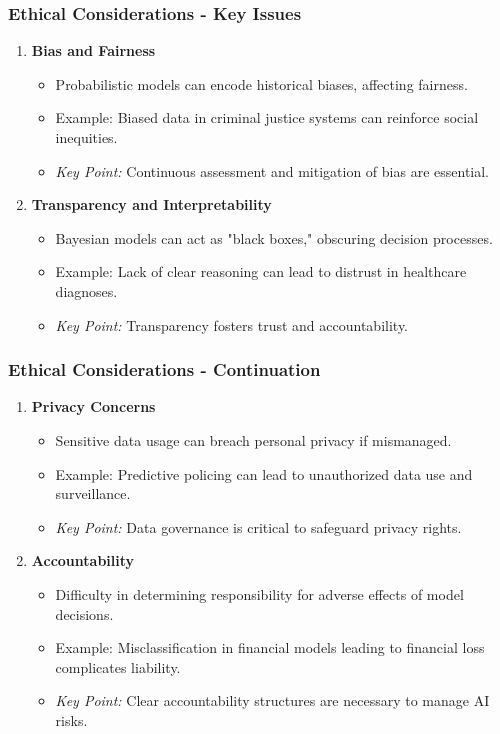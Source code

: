 \documentclass[aspectratio=169]{beamer}
\begin{document}
\begin{frame}[fragile]
    \frametitle{Ethical Considerations - Key Issues}
    \begin{enumerate}
        \item \textbf{Bias and Fairness}
            \begin{itemize}
                \item Probabilistic models can encode historical biases, affecting fairness.
                \item Example: Biased data in criminal justice systems can reinforce social inequities.
                \item \textit{Key Point:} Continuous assessment and mitigation of bias are essential.
            \end{itemize}
        
        \item \textbf{Transparency and Interpretability}
            \begin{itemize}
                \item Bayesian models can act as "black boxes," obscuring decision processes.
                \item Example: Lack of clear reasoning can lead to distrust in healthcare diagnoses.
                \item \textit{Key Point:} Transparency fosters trust and accountability.
            \end{itemize}
    \end{enumerate}
\end{frame}

\begin{frame}[fragile]
    \frametitle{Ethical Considerations - Continuation}
    \begin{enumerate}[resume]
        \item \textbf{Privacy Concerns}
            \begin{itemize}
                \item Sensitive data usage can breach personal privacy if mismanaged.
                \item Example: Predictive policing can lead to unauthorized data use and surveillance.
                \item \textit{Key Point:} Data governance is critical to safeguard privacy rights.
            \end{itemize}

        \item \textbf{Accountability}
            \begin{itemize}
                \item Difficulty in determining responsibility for adverse effects of model decisions.
                \item Example: Misclassification in financial models leading to financial loss complicates liability.
                \item \textit{Key Point:} Clear accountability structures are necessary to manage AI risks.
            \end{itemize}
    \end{enumerate}
\end{frame}
\end{document}

